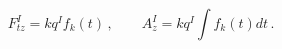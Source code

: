 \begin{equation}
F^I_{tz} = k q^I f_k(t)\,, \qquad
A^I_z = k q^I \int f_k(t) dt\,. \label{elfields}
\end{equation}

